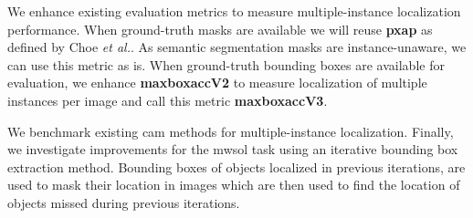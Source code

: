 We enhance existing evaluation metrics \cite{choe2020evaluating} to measure multiple-instance localization performance. When ground-truth masks are available we will reuse \textbf{\acrshort{pxap}} as defined by Choe \textit{et al.}. As semantic segmentation masks are instance-unaware, we can use this metric as is. When ground-truth bounding boxes are available for evaluation, we enhance \textbf{\acrshort{maxboxacc}V2} to measure localization of multiple instances per image and call this metric \textbf{\acrshort{maxboxacc}V3}. 

We benchmark existing \acrshort{cam} methods for multiple-instance localization. Finally, we investigate improvements for the \acrshort{mwsol} task using an iterative bounding box extraction method. Bounding boxes of objects localized in previous iterations, are used to mask their location in images which are then used to find the location of objects missed during previous iterations.
